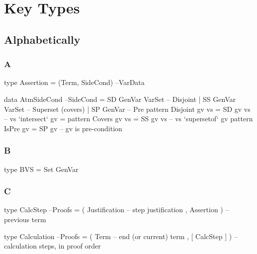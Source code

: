 \chapter{Key Types}

\section{Alphabetically}

\subsection{A}

\begin{code}
type Assertion = (Term, SideCond)                                    --VarData
\end{code}

\begin{code}
data AtmSideCond                                                    --SideCond
 = SD  GenVar VarSet -- Disjoint
 | SS  GenVar VarSet -- Superset (covers)
 | SP  GenVar        -- Pre
pattern Disjoint gv vs = SD  gv vs  --  vs `intersect`  gv = {}
pattern Covers   gv vs = SS  gv vs  --  vs `supersetof` gv
pattern IsPre    gv    = SP  gv     --  gv is pre-condition
\end{code}



\subsection{B}

\begin{code}
type BVS = Set GenVar
\end{code}

\subsection{C}

\begin{code}
type CalcStep                                                         --Proofs
  = ( Justification  -- step justification
    , Assertion )         -- previous term
\end{code}

\begin{code}
type Calculation                                                      --Proofs
  = ( Term -- end (or current) term
    , [ CalcStep ] )  -- calculation steps, in proof order
\end{code}


